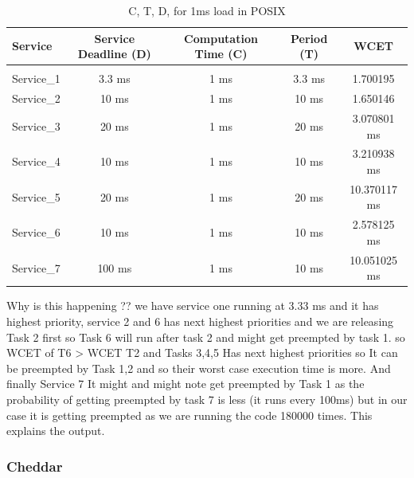 \documentclass[a4paper,11pt]{article}%
\newenvironment{qanda}{\setlength{\parindent}{0pt}}{\bigskip}
\begin{document}
\begin{qanda}
			\begin{table}[H]
				\centering
				\begin{tabular}{l c c c c}
					\hline
					\textbf{Service} & \textbf{Service	Deadline (D)} & \textbf{Computation Time (C)} & \textbf{Period (T)} & \textbf{WCET} \\\hline
					                 &                              &                                                                     \\
					Service\_1       & 3.3 ms                      & 1 ms                         & 3.3 ms              & 1.700195  \\
					Service\_2       & 10 ms                       & 1 ms                         & 10 ms             & 1.650146  \\
					Service\_3       & 20 ms                       & 1 ms                         & 20 ms             & 3.070801 ms  \\
					Service\_4       & 10 ms                       & 1 ms                         & 10 ms             & 3.210938 ms  \\
					Service\_5       & 20 ms                       & 1 ms                         & 20 ms             & 10.370117 ms  \\
					Service\_6       & 10 ms                       & 1 ms                         & 10 ms             & 2.578125 ms  \\
					Service\_7       & 100 ms                      & 1 ms                         & 10 ms             & 10.051025 ms  \\

					\hline\hline
				\end{tabular}
				\caption{C, T, D, for 1ms load in POSIX}
			\end{table}
			Why is this happening ?? we have service one running at 3.33 ms and it has highest priority, service 2 and 6 has next highest priorities and we are releasing Task 2 first so Task 6 will run after task 2 and might get preempted by task 1. so WCET of T6 > WCET T2 and Tasks 3,4,5 Has next highest priorities so It can be preempted by Task 1,2 and so their worst case execution time is more. And finally Service 7 It might and might note get preempted by Task 1 as the probability of getting preempted by task 7 is less (it runs every 100ms) but in our case it is getting preempted as we are running the code 180000 times. This explains the output.

			\subsubsection{Cheddar}


\end{qanda}
\end{document}
